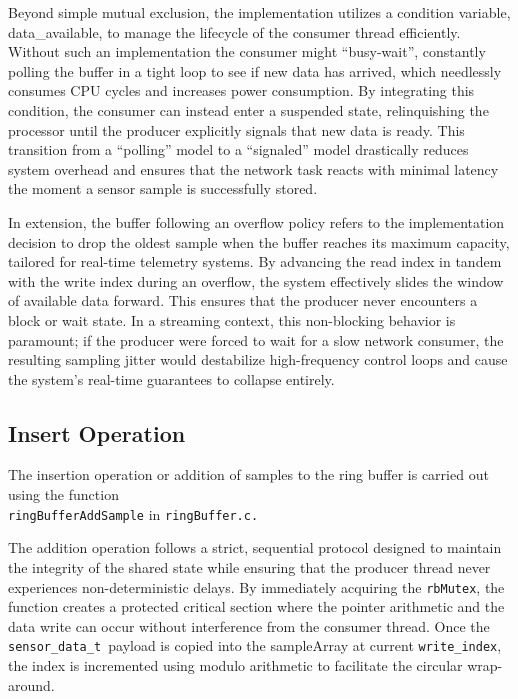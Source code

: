 Beyond simple mutual exclusion, the implementation utilizes a condition variable, data\_available, to manage the lifecycle of the consumer thread efficiently. Without such an implementation the consumer might “busy-wait”, constantly polling the buffer in a tight loop to see if new data has arrived, which needlessly consumes CPU cycles and increases power consumption. By integrating this condition, the consumer can instead enter a suspended state, relinquishing the processor until the producer explicitly signals that new data is ready. This transition from a “polling” model to a “signaled” model drastically reduces system overhead and ensures that the network task reacts with minimal latency the moment a sensor sample is successfully stored.

 In extension, the buffer following an overflow policy refers to the implementation decision to drop the oldest sample when the buffer reaches its maximum capacity, tailored for real-time telemetry systems. By advancing the read index in tandem with the write index during an overflow, the system effectively slides the window of available data forward. This ensures that the producer never encounters a block or wait state. In a streaming context, this non-blocking behavior is paramount; if the producer were forced to wait for a slow network consumer, the resulting sampling jitter would destabilize high-frequency control loops and cause the system’s real-time guarantees to collapse entirely.

\subsection{Insert Operation}
The insertion operation or addition of samples to the ring buffer is carried out using the function\\
\texttt{ringBufferAddSample} in \texttt{ringBuffer.c.}

The addition operation follows a strict, sequential protocol designed to maintain the integrity of the shared state while ensuring that the producer thread never experiences non-deterministic delays. By immediately acquiring the \texttt{rbMutex}, the function creates a protected critical section where the pointer arithmetic and the data write can occur without interference from the consumer thread. Once the \texttt{sensor\_data\_t }payload is copied into the sampleArray at current \texttt{write\_index}, the index is incremented using modulo arithmetic to facilitate the circular wrap-around.

